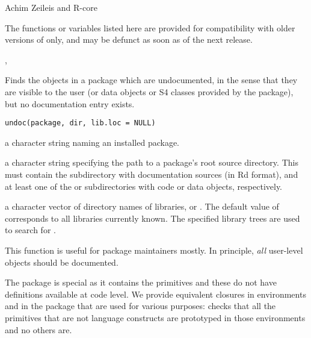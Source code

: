 %
\begin{Author}\relax
Achim Zeileis and R-core
\end{Author}
%
\begin{Description}\relax
The functions or variables listed here are provided for compatibility
with older versions of \R{} only, and may be defunct as soon as of the
next release.
\end{Description}
%
\begin{SeeAlso}\relax
{},
\end{SeeAlso}
%
\begin{Description}\relax
Finds the objects in a package which are undocumented, in the sense
that they are visible to the user (or data objects or S4 classes
provided by the package), but no documentation entry exists.
\end{Description}
%
\begin{Usage}
\begin{verbatim}
undoc(package, dir, lib.loc = NULL)
\end{verbatim}
\end{Usage}
%
\begin{Arguments}
\begin{ldescription}
\item[\code{package}] a character string naming an installed package.
\item[\code{dir}] a character string specifying the path to a package's root
source directory.  This must contain the subdirectory 
with \R{} documentation sources (in Rd format), and at least one of
the  or  subdirectories with \R{} code or data
objects, respectively.
\item[\code{lib.loc}] a character vector of directory names of \R{} libraries,
or .  The default value of  corresponds to all
libraries currently known.  The specified library trees are used to
search for .
\end{ldescription}
\end{Arguments}
%
\begin{Details}\relax
This function is useful for package maintainers mostly.  In principle,
\emph{all} user-level \R{} objects should be documented.

The  package is special as it contains the primitives and
these do not have definitions available at code level.  We provide
equivalent closures in environments  and
 in the  package that are used
for various purposes:  checks that all the
primitives that are not language constructs are prototyped in those
environments and no others are.
\end{Details}
